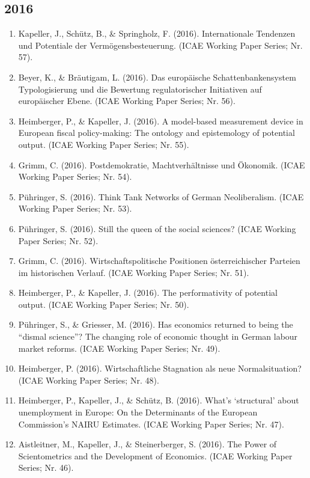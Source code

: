 \subsection*{2016}
\begin{enumerate}
	 \item Kapeller, J., Schütz, B., \& Springholz, F. (2016). Internationale Tendenzen und Potentiale der Vermögensbesteuerung. (ICAE Working Paper Series; Nr. 57).
	 \item Beyer, K., \& Bräutigam, L. (2016). Das europäische Schattenbankensystem Typologisierung und die Bewertung regulatorischer Initiativen auf europäischer Ebene. (ICAE Working Paper Series; Nr. 56).
	 \item Heimberger, P., \& Kapeller, J. (2016). A model-based measurement device in European fiscal policy-making: The ontology and epistemology of potential output. (ICAE Working Paper Series; Nr. 55).
	 \item Grimm, C. (2016). Postdemokratie, Machtverhältnisse und Ökonomik. (ICAE Working Paper Series; Nr. 54).
	 \item Pühringer, S. (2016). Think Tank Networks of German Neoliberalism. (ICAE Working Paper Series; Nr. 53).
	 \item Pühringer, S. (2016). Still the queen of the social sciences? (ICAE Working Paper Series; Nr. 52).
	 \item Grimm, C. (2016). Wirtschaftspolitische Positionen österreichischer Parteien im historischen Verlauf. (ICAE Working Paper Series; Nr. 51).
	 \item Heimberger, P., \& Kapeller, J. (2016). The performativity of potential output. (ICAE Working Paper Series; Nr. 50).
	 \item Pühringer, S., \& Griesser, M. (2016). Has economics returned to being the “dismal science”? The changing role of economic thought in German labour market reforms. (ICAE Working Paper Series; Nr. 49).
	 \item Heimberger, P. (2016). Wirtschaftliche Stagnation als \glqq neue Normalsituation\grqq{}? (ICAE Working Paper Series; Nr. 48).
	 \item Heimberger, P., Kapeller, J., \& Schütz, B. (2016). What’s ‘structural’ about unemployment in Europe: On the Determinants of the European Commission’s NAIRU Estimates. (ICAE Working Paper Series; Nr. 47).
	 \item Aistleitner, M., Kapeller, J., \& Steinerberger, S. (2016). The Power of Scientometrics and the Development of Economics. (ICAE Working Paper Series; Nr. 46).

\end{enumerate}
